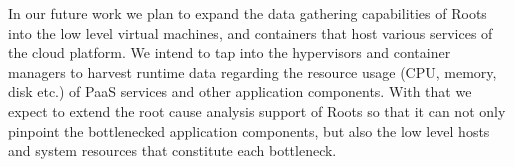 In our future work we plan to expand the data gathering capabilities of Roots into
the low level virtual machines, and containers that host various services of the cloud
platform. We intend to tap into the hypervisors
and container managers to harvest runtime data regarding the resource usage (CPU, memory, disk etc.) of
PaaS services and other application components. With that we expect to extend
the root cause analysis support of Roots so that it can not only pinpoint the
bottlenecked application components, but also the low level hosts and system
resources that constitute each bottleneck.
